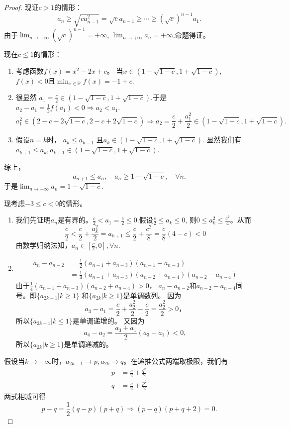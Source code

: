 \documentclass[utf8]{book}
\begin{document}
\begin{proof}
现证$c>1$的情形：
$$a_{n} \geq \sqrt{ca_{n-1}^2} = \sqrt{c}a_{n-1} \geq \cdots \geq \left(\sqrt{c}\right)^{n-1}a_1.$$
由于$\displaystyle\lim_{n\to +\infty}\left(\sqrt{c}\right)^{n-1} = +\infty$, $\displaystyle\lim_{n\to +\infty}a_{n} = +\infty$.命题得证。

现在$c\leq 1$的情形：
\renewcommand\labelenumi{\normalfont(\theenumi)}
\begin{enumerate}
\item 考虑函数$f(x) = x^2-2x+c$。 当$x\in (1-\sqrt{1-c}, 1+\sqrt{1-c})$, $f(x) < 0$且$\displaystyle\min_{x\in \mathbb{R}}f(x) = -1+c$.
\item 很显然 $a_1=\frac{c}{2} \in (1-\sqrt{1-c}, 1+\sqrt{1-c})$.于是$a_2 - a_1 = \frac{1}{2}f(a_1) < 0 \Rightarrow a_2 < a_1$.
$$a^2_1\in(2-c-2\sqrt{1-c}, 2-c+2\sqrt{1-c})\Rightarrow a_2 = \frac{c}{2} + \frac{a_1^2}{2}\in (1-\sqrt{1-c}, 1+\sqrt{1-c}).$$
\item 假设$n=k$时， $a_k \leq a_{k-1}$ 且$a_k\in (1-\sqrt{1-c}, 1+\sqrt{1-c})$. 显然我们有$a_{k+1} \leq a_k, a_{k+1}\in (1-\sqrt{1-c}, 1+\sqrt{1-c})$.
\end{enumerate}
综上，
$$a_{n+1}\leq a_{n}, \quad a_n\geq 1-\sqrt{1-c}, \quad\forall n.$$
于是$\displaystyle\lim_{n\to +\infty}a_{n}=1-\sqrt{1-c}$.

现考虑$-3\leq c < 0$的情形。
\renewcommand\labelenumi{\normalfont(\theenumi)}
\begin{enumerate}
\item 我们先证明$a_n$是有界的。$\frac{c}{2} < a_1 = \frac{c}{2} \leq 0$.假设$\frac{c}{2} \leq a_k\leq 0$, 则$0 \leq a_k^2 \leq \frac{c^2}{4}$。从而
$$\frac{c}{2} < \frac{c}{2} + \frac{a_k^2}{2} = a_{k+1} \leq \frac{c}{2} + \frac{c^2}{8} = \frac{c}{8}(4 - c) < 0$$
由数学归纳法知，$a_n\in\left[\frac{c}{2}, 0\right], \forall n$.
\item \begin{equation*}
\begin{split}
a_n - a_{n-2} &= \frac{1}{2}\left(a_{n-1}+a_{n-3}\right)\left(a_{n-1}-a_{n-3}\right) \\&= \frac{1}{4}\left(a_{n-1}+a_{n-3}\right)\left(a_{n-2}+a_{n-4}\right)(a_{n-2}-a_{n-4})
\end{split}
\end{equation*}
由于$\frac{1}{4}\left(a_{n-1}+a_{n-3}\right)\left(a_{n-2}+a_{n-4}\right) > 0$， $a_n - a_{n-2}$和$a_{n-2}-a_{n-4}$同号。即$\{a_{2k-1}| k \geq 1\}$
和$\{a_{2k}| k \geq 1\}$是单调数列。
因为$$a_3 - a_1 = \frac{c}{2}+\frac{a_2^2}{2} - \frac{c}{2} = \frac{a_2^2}{2} > 0，$$所以$\{a_{2k-1}| k \leq 1\}$是单调递增的。
又因为
$$a_4-a_2 = \frac{a_3+a_1}{2}\left(a_3 - a_1\right) < 0,$$
所以$\{a_{2k}| k \geq 1\}$是单调递减的。
\end{enumerate}
假设当$k\rightarrow+\infty$时，$a_{2k-1}\rightarrow p, a_{2k}\rightarrow q$。在递推公式两端取极限，我们有
\begin{equation*}
\begin{split}
p&=\frac{c}{2}+\frac{q^2}{2}\\
q&=\frac{c}{2}+\frac{p^2}{2}
\end{split}
\end{equation*}
两式相减可得
$$p-q=\frac{1}{2}(q-p)(p+q)\Rightarrow (p-q)(p+q+2) = 0.$$


\end{proof}
\end{document}
